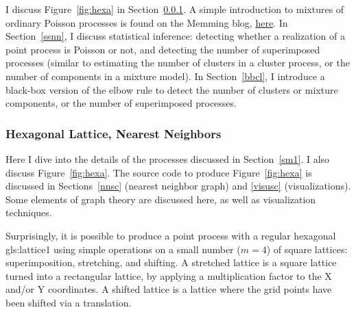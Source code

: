 \documentclass[10pt]{article}
\begin{document}
I discuss Figure~\ref{fig:hexa} in Section~\ref{sm2}. A simple introduction to mixtures of ordinary Poisson processes is found on the Memming blog,
\href{https://memming.wordpress.com/2012/08/28/mixture-of-point-processes/}{here}.
In Section~\ref{ssnn}, I discuss statistical inference: detecting whether a realization of a point
process is Poisson or not, and detecting the number of superimposed processes (similar to estimating the number of clusters in a
\textcolor{index}{cluster process}, or the number of components in a \textcolor{index}{mixture model}).
 In Section~\ref{bbcl}, I introduce  a black-box version of the
\textcolor{index}{elbow rule} to detect the number of clusters or mixture components, or
the number of superimposed processes.

\subsubsection{Hexagonal Lattice, Nearest Neighbors}\label{sm2}

Here I dive into the details of the processes discussed in Section~\ref{sm1}. I also discuss Figure~\ref{fig:hexa}. The source code to produce Figure~\ref{fig:hexa} is discussed in Sections~\ref{nnsc} (nearest neighbor graph) and \ref{visusc} (visualizations).
Some elements of \textcolor{index}{graph theory} are discussed here, as well as \textcolor{index}{visualization} techniques.

 Surprisingly, it is possible to produce a point process with a regular hexagonal \gls{gls:lattice1}  using simple operations on a small number ($m=4$) of square lattices: superimposition, stretching, and shifting. A
\textcolor{index}{stretched lattice}
is a square lattice turned into a rectangular lattice, by applying a multiplication factor to the X and/or Y coordinates.  A
\textcolor{index}{shifted lattice} is a lattice where the grid points have been shifted via a translation.
\end{document}
